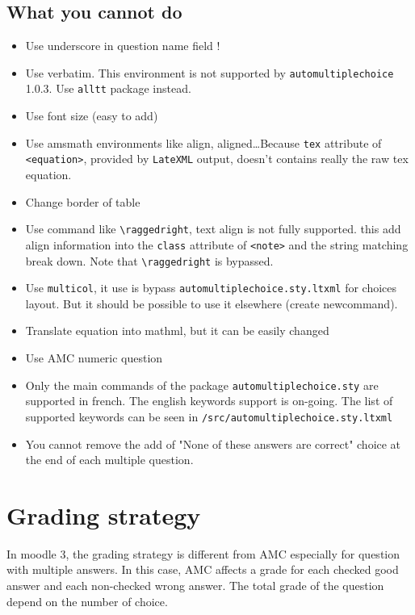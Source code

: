 \documentclass[a4paper]{article}
\newcommand{\elem}[1]{\texttt{<#1>}}
\begin{document}
\subsection{What you cannot do}\label{sec:cannot}
\begin{itemize}
\item Use underscore in question name field !
\item Use verbatim. This environment is not supported by \texttt{automultiplechoice} 1.0.3. Use \texttt{alltt} package instead.
\item Use font size (easy to add)
\item Use amsmath environments like align, aligned\dots Because  \texttt{tex} attribute of \elem{equation}, provided by \texttt{LateXML} output, doesn't contains really the raw tex equation.
\item Change border of table
\item Use command like \texttt{\textbackslash raggedright}, text align is not fully supported. this add align information into the \texttt{class} attribute of \elem{note} and the string matching break down. Note that \texttt{\textbackslash raggedright} is bypassed. %
\item Use \texttt{multicol}, it use is bypass \texttt{automultiplechoice.sty.ltxml} for choices layout. But it should be possible to use it elsewhere (create newcommand).
\item Translate equation into mathml, but it can be easily changed
\item Use AMC numeric question
\item Only the main commands of the package \texttt{automultiplechoice.sty} are supported in french. The english keywords support is on-going. The list of supported keywords can be seen in \texttt{/src/automultiplechoice.sty.ltxml}
\item You cannot remove the add of "None of these answers are correct" choice at the end of each multiple question.


\end{itemize}
 
\section{Grading strategy}
In moodle 3, %
the grading strategy is different from AMC especially for question with multiple answers. In this case, AMC affects a grade for each checked good answer and each non-checked wrong answer. The total grade of the question depend on the number of choice.
\end{document}
